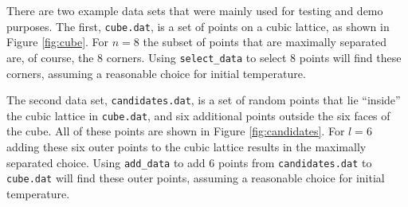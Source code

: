 \documentclass{article}
\begin{document}
There are two example data sets that were mainly used for testing and demo purposes.
The first, \texttt{cube.dat}, is a set of points on a cubic lattice, as shown in Figure \ref{fig:cube}.
For $n = 8$ the subset of points that are maximally separated are, of course, the 8 corners.
Using \texttt{select\_data} to select 8 points will find these corners, assuming a reasonable choice for initial temperature.

The second data set, \texttt{candidates.dat}, is a set of random points that lie ``inside'' the cubic lattice in \texttt{cube.dat}, and six additional points outside the six faces of the cube.
All of these points are shown in Figure \ref{fig:candidates}.
For $l = 6$ adding these six outer points to the cubic lattice results in the maximally separated choice.
Using \texttt{add\_data} to add 6 points from \texttt{candidates.dat} to \texttt{cube.dat} will find these outer points, assuming a reasonable choice for initial temperature.
\end{document}
